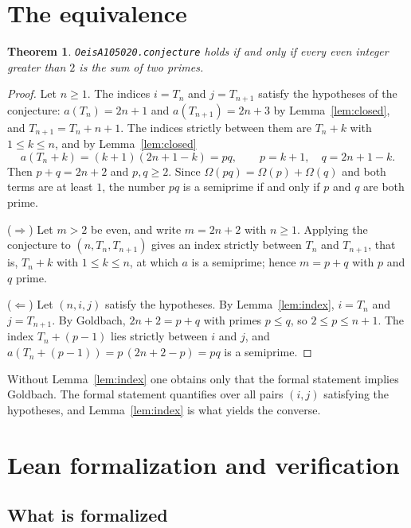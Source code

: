 \documentclass[11pt,a4paper]{article}
\newcommand{\li}{\lstinline[style=inline]}
\theoremstyle{plain}
\newtheorem{theorem}{Theorem}
\theoremstyle{remark}
\begin{document}
\section{The equivalence}\label{sec:equiv}

\begin{theorem}\label{thm:main}
\li{OeisA105020.conjecture} holds if and only if every even integer greater than $2$
is the sum of two primes.
\end{theorem}

\begin{proof}
Let $n \ge 1$. The indices $i = T_n$ and $j = T_{n+1}$ satisfy the hypotheses of the
conjecture: $a(T_n) = 2n+1$ and $a(T_{n+1}) = 2n+3$ by Lemma~\ref{lem:closed}, and
$T_{n+1} = T_n + n + 1$. The indices strictly between them are $T_n + k$ with
$1 \le k \le n$, and by Lemma~\ref{lem:closed}
\[
  a(T_n + k) = (k+1)(2n+1-k) = pq, \qquad p = k+1, \quad q = 2n+1-k.
\]
Then $p + q = 2n+2$ and $p, q \ge 2$. Since $\Omega(pq) = \Omega(p) + \Omega(q)$ and
both terms are at least $1$, the number $pq$ is a semiprime if and only if $p$ and $q$
are both prime.

($\Rightarrow$) Let $m > 2$ be even, and write $m = 2n+2$ with $n \ge 1$. Applying the
conjecture to $(n, T_n, T_{n+1})$ gives an index strictly between $T_n$ and
$T_{n+1}$, that is, $T_n + k$ with $1 \le k \le n$, at which $a$ is a semiprime; hence
$m = p + q$ with $p$ and $q$ prime.

($\Leftarrow$) Let $(n, i, j)$ satisfy the hypotheses. By Lemma~\ref{lem:index},
$i = T_n$ and $j = T_{n+1}$. By Goldbach, $2n+2 = p + q$ with primes $p \le q$, so
$2 \le p \le n+1$. The index $T_n + (p-1)$ lies strictly between $i$ and $j$, and
$a(T_n + (p-1)) = p\,(2n+2-p) = pq$ is a semiprime.
\end{proof}

Without Lemma~\ref{lem:index} one obtains only that the formal statement implies
Goldbach. The formal statement quantifies over all pairs $(i,j)$ satisfying the
hypotheses, and Lemma~\ref{lem:index} is what yields the converse.

\section{Lean formalization and verification}\label{sec:lean}

\subsection{What is formalized}
\end{document}
